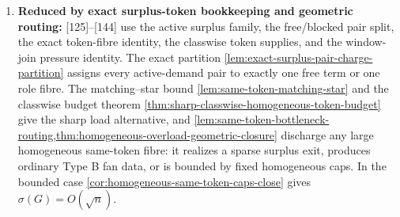 \documentclass[11pt]{article}
\begin{document}
\begin{enumerate}[label=\arabic*., leftmargin=1.8em]
\item \textbf{Reduced by exact surplus-token bookkeeping and geometric routing:} {[125]}--{[144]} use the active surplus family, the free/blocked pair split, the exact token-fibre identity, the classwise token supplies, and the window-join pressure identity.  The exact partition \cref{lem:exact-surplus-pair-charge-partition} assigns every active-demand pair to exactly one free term or one role fibre.  The matching--star bound \cref{lem:same-token-matching-star} and the classwise budget theorem \cref{thm:sharp-classwise-homogeneous-token-budget} give the sharp load alternative, and \cref{lem:same-token-bottleneck-routing,thm:homogeneous-overload-geometric-closure} discharge any large homogeneous same-token fibre: it realizes a sparse surplus exit, produces ordinary Type B fan data, or is bounded by fixed homogeneous caps.  In the bounded case \cref{cor:homogeneous-same-token-caps-close} gives \(\sigma(G)=O(\sqrt n)\).
\end{enumerate}
\end{document}
